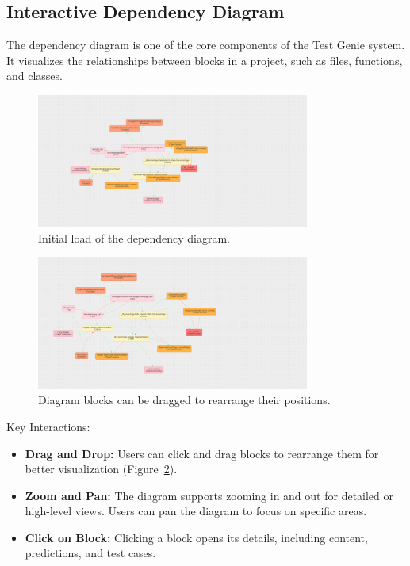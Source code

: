 \subsection{Interactive Dependency Diagram}

The dependency diagram is one of the core components of the Test Genie system. It visualizes the relationships between blocks in a project, such as files, functions, and classes.

\begin{figure}[H]
    \centering
    \includegraphics[width=0.8\textwidth]{images/diagram-initial_load.png}
    \caption{Initial load of the dependency diagram.}
    \label{fig:diagram-initial_load}
\end{figure}

\begin{figure}[H]
    \centering
    \includegraphics[width=0.8\textwidth]{images/diagram-dragged.png}
    \caption{Diagram blocks can be dragged to rearrange their positions.}
    \label{fig:diagram-dragged}
\end{figure}

Key Interactions:
\begin{itemize}
    \item \textbf{Drag and Drop:} Users can click and drag blocks to rearrange them for better visualization (Figure~\ref{fig:diagram-dragged}).
    \item \textbf{Zoom and Pan:} The diagram supports zooming in and out for detailed or high-level views. Users can pan the diagram to focus on specific areas.
    \item \textbf{Click on Block:} Clicking a block opens its details, including content, predictions, and test cases.
\end{itemize}


